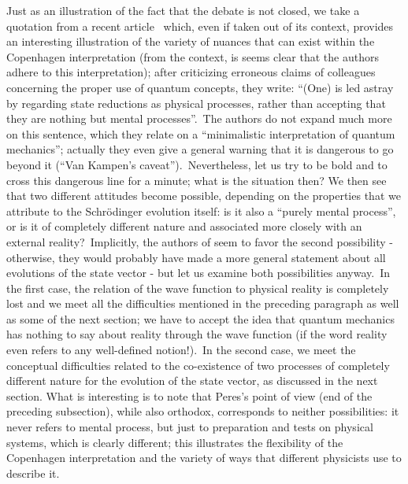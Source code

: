 \documentclass[12pt,onecolumn]{article}%
\begin{document}
Just as an illustration of the fact that the debate is not closed, we take a
quotation from a recent article\ \cite{mental} which, even if taken out of its
context, provides an interesting illustration of the variety of nuances that
can exist within the Copenhagen interpretation (from the context, is seems
clear that the authors adhere to this interpretation); after criticizing
erroneous claims of colleagues concerning the proper use of quantum concepts,
they write: ``(One) is led astray by regarding state reductions as physical
processes, rather than accepting that they are nothing but mental
processes''.\ The authors do not expand much more on this sentence, which they
relate on a ``minimalistic interpretation of quantum mechanics''; actually
they even give a general warning that it is dangerous to go beyond it (``Van
Kampen's caveat'').\ Nevertheless, let us try to be bold and to cross this
dangerous line for a minute; what is the situation then? We then see that two
different attitudes become possible, depending on the properties that we
attribute to the Schr\"{o}dinger evolution itself: is it also a ``purely
mental process'', or is it of completely different nature and associated more
closely with an external reality?\ Implicitly, the authors of \cite{mental}
seem to favor the second possibility - otherwise, they would probably have
made a more general statement about all evolutions of the state vector - but
let us examine both possibilities anyway.\ In the first case, the relation of
the wave function to physical reality is completely lost and we meet all the
difficulties mentioned in the preceding paragraph as well as some of the next
section; we have to accept the idea that quantum mechanics has nothing to say
about reality through the wave function (if the word reality even refers to
any well-defined notion!).\ In the second case, we meet the conceptual
difficulties related to the co-existence of two processes of completely
different nature for the evolution of the state vector, as discussed in the
next section. What is interesting is to note that Peres's point of view (end
of the preceding subsection), while also orthodox, corresponds to neither
possibilities: it never refers to mental process, but just to preparation and
tests on physical systems, which is clearly different; this illustrates the
flexibility of the Copenhagen interpretation and the variety of ways that
different physicists use to describe it.
\end{document}
